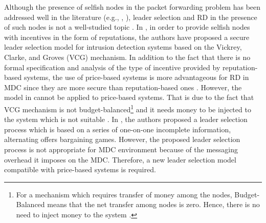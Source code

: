 \documentclass[journal,12pt, onecolumn]{IEEEtran}
\begin{document}
Although the presence of selfish nodes in the packet forwarding problem has been addressed well in the literature (e.g., \cite{x20}, \cite{x21}), leader selection and RD in the presence of such nodes is not a well-studied topic
\cite{Mohammad_2013_malicious}. In \cite{x22}, in order to provide selfish nodes with incentives in the form of reputations, the authors have proposed a secure leader selection model for intrusion detection systems based on the Vickrey, Clarke, and Groves (VCG) mechanism. 
In addition to the fact that there is no formal specification and analysis of the type of
incentive provided by reputation-based systems, the use of price-based systems is more advantageous for RD in MDC since they are more secure than reputation-based ones \cite{x23}. However, 
the model in \cite{x22} cannot be applied to price-based systems. That is due to the fact that VCG mechanism is not budget-balanced\footnote[1]{For a mechanism which requires transfer of money among the nodes, Budget-Balanced means that the net transfer among nodes is zero. Hence, there is no need to inject money to the system \cite{x24}.} and it needs money to be injected to the system which is not suitable \cite{x2200}. 
In \cite{Mohammad_2013_leader}, the authors proposed a leader selection process which is based on a series of one-on-one incomplete information, alternating offers bargaining games. However, the proposed leader selection process is not appropriate for MDC environment because of the messaging overhead it imposes on the MDC.
Therefore, a new leader selection model compatible with price-based systems is required.
\end{document}
